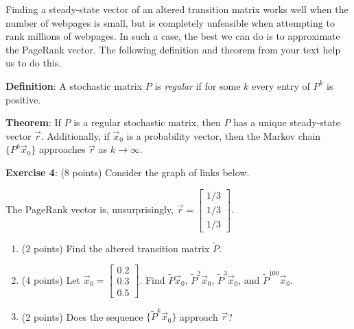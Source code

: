 \documentclass{article}
\begin{document}
Finding a steady-state vector of an altered transition matrix works well when the number of webpages is small, but is completely unfeasible when attempting to rank millions of webpages. In such a case, the best we can do is to approximate the PageRank vector. The following definition and theorem from your text help us to do this.

\textbf{Definition}: A stochastic matrix $P$ is \emph{regular} if for some $k$ every entry of $P^k$ is positive.

\textbf{Theorem}: If $P$ is a regular stochastic matrix, then $P$ has a unique steady-state vector $\vec{r}$. Additionally, if $\vec{x}_0$ is a probability vector, then the Markov chain $\{P^k\vec{x}_0\}$ approaches $\vec{r}$ as $k \to \infty$.

\textbf{Exercise 4}: (8 points) Consider the graph of links below.

\begin{center}
\end{center}

The PageRank vector is, unsurprisingly, $\vec{r} = \begin{bmatrix}
    1/3 \\
    1/3 \\
    1/3
  \end{bmatrix}$.

\begin{enumerate}[label=\alph*.]

  \item (2 points) Find the altered transition matrix $\widetilde{P}$.

  \item (4 points) Let $\vec{x}_0 = \begin{bmatrix}
            0.2 \\
            0.3 \\
            0.5
          \end{bmatrix}$. Find $\widetilde{P}\vec{x}_0$, $\widetilde{P}^2\vec{x}_0$, $\widetilde{P}^3\vec{x}_0$, and $\widetilde{P}^{100}\vec{x}_0$.

  \item (2 points) Does the sequence $\{\widetilde{P}^k\vec{x}_0\}$ approach $\vec{r}$?

\end{enumerate}
\end{document}
